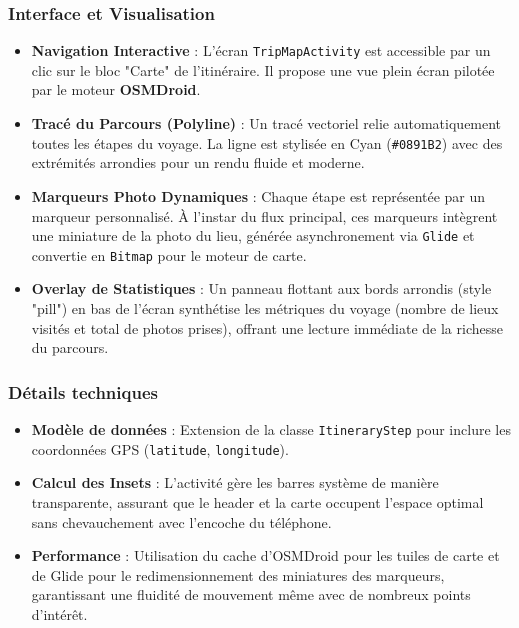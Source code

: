 \documentclass{article}
\begin{document}
\subsubsection{Interface et Visualisation}
\begin{itemize}
    \item \textbf{Navigation Interactive} : L'écran \texttt{TripMapActivity} est accessible par un clic sur le bloc "Carte" de l'itinéraire. Il propose une vue plein écran pilotée par le moteur \textbf{OSMDroid}.
    \item \textbf{Tracé du Parcours (Polyline)} : Un tracé vectoriel relie automatiquement toutes les étapes du voyage. La ligne est stylisée en Cyan (\texttt{\#0891B2}) avec des extrémités arrondies pour un rendu fluide et moderne.
    \item \textbf{Marqueurs Photo Dynamiques} : Chaque étape est représentée par un marqueur personnalisé. À l'instar du flux principal, ces marqueurs intègrent une miniature de la photo du lieu, générée asynchronement via \texttt{Glide} et convertie en \texttt{Bitmap} pour le moteur de carte.
    \item \textbf{Overlay de Statistiques} : Un panneau flottant aux bords arrondis (style "pill") en bas de l'écran synthétise les métriques du voyage (nombre de lieux visités et total de photos prises), offrant une lecture immédiate de la richesse du parcours.
\end{itemize}

\subsubsection{Détails techniques}
\begin{itemize}
    \item \textbf{Modèle de données} : Extension de la classe \texttt{ItineraryStep} pour inclure les coordonnées GPS (\texttt{latitude}, \texttt{longitude}).
    \item \textbf{Calcul des Insets} : L'activité gère les barres système de manière transparente, assurant que le header et la carte occupent l'espace optimal sans chevauchement avec l'encoche du téléphone.
    \item \textbf{Performance} : Utilisation du cache d'OSMDroid pour les tuiles de carte et de Glide pour le redimensionnement des miniatures des marqueurs, garantissant une fluidité de mouvement même avec de nombreux points d'intérêt.
\end{itemize}
\end{document}
